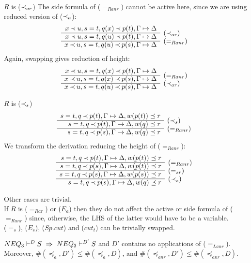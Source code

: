 \begin{PROOF}
\begin{LS}
%
\item $R$ is ($\mathbin{\prec}_{ar}$) The side formula of ($=_{Ranr}$) cannot be active
here, since we are using reduced version of ($\mathbin{\prec}_a$):
\[ \begin{array}{rl}
x\Incl u, s=t, q(x)\Incl p(t), \GSD \\ \cline{1-1}
x\Incl u, s=t, q(u)\Incl p(t), \GSD & \rabove{(\Incl_{ar})} \\ \cline{1-1}
x\Incl u, s=t, q(u)\Incl p(s), \GSD & \rabove{(=_{Ranr})} \end{array} \]
Again, swapping gives reduction of height:
\[ \begin{array}{rl}
x\Incl u, s=t, q(x)\Incl p(t), \GSD \\ \cline{1-1}
x\Incl u, s=t, q(x)\Incl p(s), \GSD & \rabove{(=_{Ranr})} \\ \cline{1-1}
x\Incl u, s=t, q(u)\Incl p(s), \GSD & \rabove{(\Incl_{ar})} \end{array} \]
%
\item $R$ is ($\mathbin{\prec}_{s}$)
\[ \begin{array}{rl}
s=t, q\Incl p(t), \GSD, w(p(t))\preceq r \\ \cline{1-1}
s=t, q\Incl p(t), \GSD, w(q)\preceq r & \rabove{(\Incl_s)} \\ \cline{1-1}
s=t, q\Incl p(s), \GSD, w(q)\preceq r & \rabove{(=_{Ranr})} \end{array} \]
We transform the derivation reducing the height of ($=_{Ranr}$):
\[ \begin{array}{rl}
s=t, q\Incl p(t), \GSD, w(p(t))\preceq r \\ \cline{1-1}
s=t, q\Incl p(s), \GSD, w(p(t))\preceq r & \rabove{(=_{Ranr})} \\ \cline{1-1}
s=t, q\Incl p(s), \GSD, w(p(s))\preceq r & \rabove{(=_{sr})} \\ \cline{1-1}
s=t, q\Incl p(s), \GSD, w(q)\preceq r & \rabove{(\Incl_s)} \end{array} \]
%
\item Other cases are trivial. \\
If $R$ is ($=_{Rar}$) or ($E_a$) then they do not affect the active or side
formula of ($=_{Ranr}$) since, otherwise, the LHS of the latter would have to
be a variable. \\
 ($=_s$), ($E_s$), ($Sp.cut$) and ($cut_t$) can be trivially swapped.
\end{LS}
\end{PROOF}
%
\begin{LEMMA}\label{le:noLanr}
 ${NEQ_3}\vdash^{{D}}S\ \mathrel\Rightarrow\ {NEQ_3}\vdash^{{D'}}S$ and $D'$ contains no
applications of ($=_{Lanr}$).
Moreover, $\#(\preceq_a,D')\leq\#(\preceq_a,D)$, and 
$\#(\preceq_{anr},D')\leq\#(\preceq_{anr},D)$.
\end{LEMMA}
